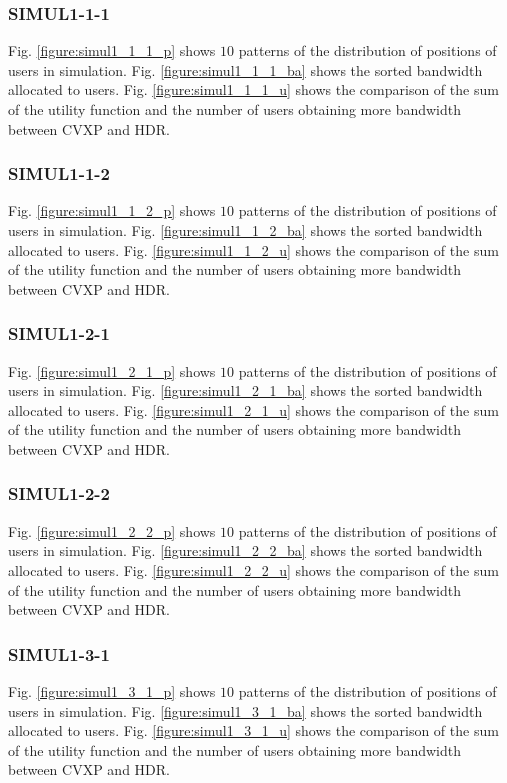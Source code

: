 
\subsubsection{SIMUL1-1-1}
	Fig. \ref{figure:simul1_1_1_p} shows $10$ patterns of the distribution of positions of users in simulation. Fig. \ref{figure:simul1_1_1_ba} shows the sorted bandwidth allocated to users. Fig. \ref{figure:simul1_1_1_u} shows the comparison of the sum of the utility function and the number of users obtaining more bandwidth between CVXP and HDR.
	
\subsubsection{SIMUL1-1-2}
	Fig. \ref{figure:simul1_1_2_p} shows $10$ patterns of the distribution of positions of users in simulation. Fig. \ref{figure:simul1_1_2_ba} shows the sorted bandwidth allocated to users. Fig. \ref{figure:simul1_1_2_u} shows the comparison of the sum of the utility function and the number of users obtaining more bandwidth between CVXP and HDR.
	
\subsubsection{SIMUL1-2-1}
	Fig. \ref{figure:simul1_2_1_p} shows $10$ patterns of the distribution of positions of users in simulation. Fig. \ref{figure:simul1_2_1_ba} shows the sorted bandwidth allocated to users. Fig. \ref{figure:simul1_2_1_u} shows the comparison of the sum of the utility function and the number of users obtaining more bandwidth between CVXP and HDR.
	
\subsubsection{SIMUL1-2-2}
	Fig. \ref{figure:simul1_2_2_p} shows $10$ patterns of the distribution of positions of users in simulation. Fig. \ref{figure:simul1_2_2_ba} shows the sorted bandwidth allocated to users. Fig. \ref{figure:simul1_2_2_u} shows the comparison of the sum of the utility function and the number of users obtaining more bandwidth between CVXP and HDR.
	
\subsubsection{SIMUL1-3-1}
	Fig. \ref{figure:simul1_3_1_p} shows $10$ patterns of the distribution of positions of users in simulation. Fig. \ref{figure:simul1_3_1_ba} shows the sorted bandwidth allocated to users. Fig. \ref{figure:simul1_3_1_u} shows the comparison of the sum of the utility function and the number of users obtaining more bandwidth between CVXP and HDR.
	
